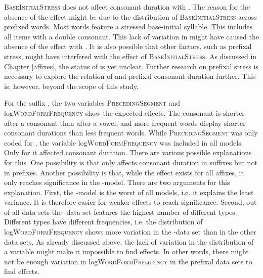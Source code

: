  \textsc{BaseInitialStress} does not affect consonant duration with . The reason for the absence of the effect might be due to the distribution of \textsc{BaseInitialStress} across prefixed words. Most words feature a stressed base-initial syllable. This includes all items with a double consonant. This lack of variation in  might have caused the absence of the effect with . It is also possible that other factors, such as prefixal stress, might have interfered with the effect of \textsc{BaseInitialStress}. As discussed in Chapter \ref{affixes}, the  status of  is yet unclear. Further research on prefixal stress is necessary to explore the relation of  and prefixal consonant duration further. This is, however, beyond the scope of this study.\largerpage

For the suffix , the two variables \textsc{PrecedingSegment} and log\textsc{WordForm\-Frequency} show the expected effects. The consonant is shorter after a consonant than after a vowel, and more frequent words display shorter consonant durations than less frequent words. While \textsc{PrecedingSegment} was only coded for , the variable log\textsc{WordFormFrequency} was included in all models. Only for  it affected consonant duration. There are various possible explanations for this. 
One possibility is that  only affects consonant duration in suffixes but not in prefixes. Another possibility is that, while the effect exists for all affixes, it only reaches significance in the -model. There are two arguments for this explanation.
 First, the -model is the worst of all models, i.e. it explains the least variance. It is therefore easier for weaker effects to reach significance. 
 Second, out of all data sets the -data set features the highest number of different types. Different types have different frequencies, i.e. the distribution of log\textsc{WordFormFrequency} shows more variation in the -data set than in the other data sets. As already discussed above, the lack of variation in the distribution of a variable might make it impossible to find effects. In other words, there might not be enough variation in log\textsc{WordFormFrequency} in the prefixal data sets to find effects.


